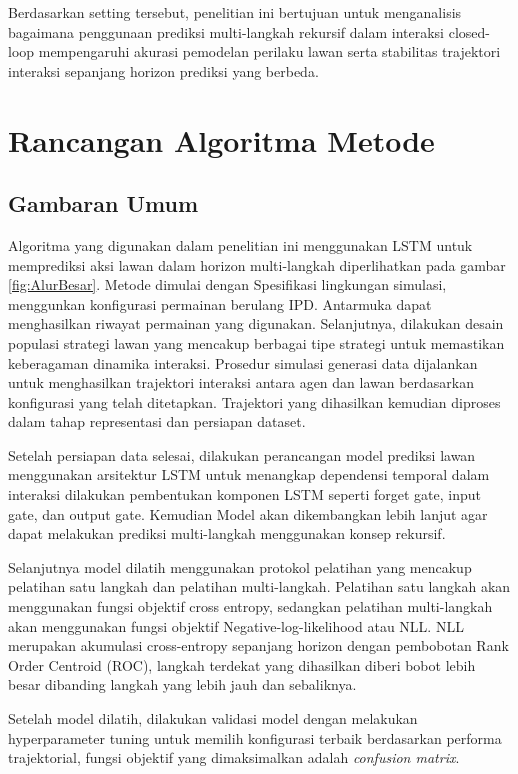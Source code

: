 Berdasarkan setting tersebut, penelitian ini bertujuan untuk menganalisis bagaimana penggunaan prediksi multi-langkah rekursif dalam interaksi closed-loop mempengaruhi akurasi pemodelan perilaku lawan serta stabilitas trajektori interaksi sepanjang horizon prediksi yang berbeda.

\section{Rancangan Algoritma Metode}
\subsection{Gambaran Umum}
Algoritma yang digunakan dalam penelitian ini menggunakan LSTM untuk memprediksi aksi lawan dalam horizon multi-langkah diperlihatkan pada gambar \ref{fig:AlurBesar}.
Metode dimulai dengan Spesifikasi lingkungan simulasi, menggunkan konfigurasi permainan berulang IPD. Antarmuka dapat menghasilkan riwayat permainan yang digunakan. Selanjutnya, dilakukan desain populasi strategi lawan yang mencakup berbagai tipe strategi untuk memastikan keberagaman dinamika interaksi. Prosedur simulasi generasi data dijalankan untuk menghasilkan trajektori interaksi antara agen dan lawan berdasarkan konfigurasi yang telah ditetapkan. Trajektori yang dihasilkan kemudian diproses dalam tahap representasi dan persiapan dataset. 

Setelah persiapan data selesai, dilakukan perancangan model prediksi lawan menggunakan arsitektur LSTM untuk menangkap dependensi temporal dalam interaksi dilakukan pembentukan komponen LSTM seperti forget gate, input gate, dan output gate. Kemudian Model akan dikembangkan lebih lanjut agar dapat melakukan prediksi multi-langkah menggunakan konsep rekursif.

Selanjutnya model dilatih menggunakan protokol pelatihan yang mencakup pelatihan satu langkah dan pelatihan multi-langkah. Pelatihan satu langkah akan menggunakan fungsi objektif cross entropy, sedangkan pelatihan multi-langkah akan menggunakan fungsi objektif Negative-log-likelihood atau NLL. NLL merupakan akumulasi cross-entropy sepanjang horizon dengan pembobotan Rank Order Centroid (ROC), langkah terdekat yang dihasilkan diberi bobot lebih besar dibanding langkah yang lebih jauh dan sebaliknya. 

Setelah model dilatih, dilakukan validasi model dengan melakukan hyperparameter tuning untuk memilih konfigurasi terbaik berdasarkan performa trajektorial, fungsi objektif yang dimaksimalkan adalah \textit{confusion matrix}.  

